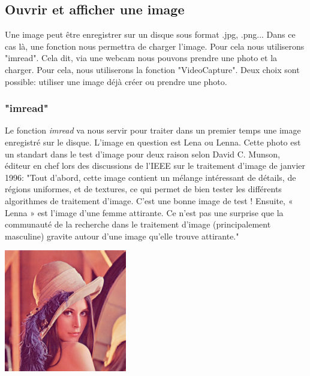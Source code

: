 \documentclass[12pt, french]{report}
\begin{document}
        \subsection{Ouvrir et afficher une image}
                Une image peut être enregistrer sur un disque sous format .jpg, .png... Dans ce cas là, une fonction nous permettra de charger l'image. Pour cela nous utiliserons "imread". Cela dit, via une webcam nous pouvons prendre une photo et la charger. Pour cela, nous utiliserons la fonction "VideoCapture". Deux choix sont possible: utiliser une image déjà créer ou prendre une photo.


                \subsubsection{"imread"}
                Le fonction \textit{imread} va nous servir pour traiter dans un premier temps une image enregistré sur le disque.
                L'image en question est Lena ou Lenna.
                Cette photo est un standart dans le test d'image pour deux raison selon David C. Munson, éditeur en chef lors des discussions de l'IEEE sur le traitement d'image de janvier 1996: 
                "Tout d'abord, cette image contient un mélange intéressant de détails, de régions uniformes, et de textures, ce qui permet de bien tester les différents algorithmes de traitement d'image. C'est une bonne image de test ! Ensuite, « Lenna » est l'image d'une femme attirante. Ce n'est pas une surprise que la communauté de la recherche dans le traitement d'image (principalement masculine) gravite autour d'une image qu'elle trouve attirante." \\
                \begin{center}
                        \includegraphics[width=0.4\textwidth]{Images/Lenna.png}
                \end{center}
\end{document}
